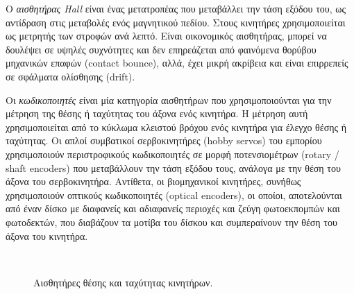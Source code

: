 \begin{enumerate}
Ο \textit{αισθητήρας Hall} είναι ένας μετατροπέας που μεταβάλλει την τάση εξόδου του, ως αντίδραση στις μεταβολές ενός μαγνητικού πεδίου. Στους κινητήρες χρησιμοποιείται ως μετρητής των στροφών ανά λεπτό. Είναι οικονομικός αισθητήρας, μπορεί να δουλέψει σε υψηλές συχνότητες και δεν επηρεάζεται από φαινόμενα θορύβου μηχανικών επαφών (contact bounce), αλλά, έχει μικρή ακρίβεια και είναι επιρρεπείς σε σφάλματα ολίσθησης (drift).

Οι \textit{κωδικοποιητές} είναι μία κατηγορία αισθητήρων που χρησιμοποιούνται για την μέτρηση της θέσης ή ταχύτητας του άξονα ενός κινητήρα. Η μέτρηση αυτή χρησιμοποιείται από το κύκλωμα κλειστού βρόχου ενός κινητήρα για έλεγχο θέσης ή ταχύτητας. Οι απλοί {συμβατικοί σερβοκινητήρες (hobby servos)} του εμπορίου χρησιμοποιούν {περιστροφικούς κωδικοποιητές} σε μορφή ποτενσιομέτρων ({rotary / shaft encoders}) που μεταβάλλουν την τάση εξόδου τους, ανάλογα με την θέση του άξονα του σερβοκινητήρα. Αντίθετα, οι {βιομηχανικοί κινητήρες}, συνήθως χρησιμοποιούν {οπτικούς κωδικοποιητές (optical encoders)}, οι οποίοι, αποτελούνται από έναν δίσκο με διαφανείς και αδιαφανείς περιοχές και ζεύγη φωτοεκπομπών και φωτοδεκτών, που διαβάζουν τα μοτίβα του δίσκου και συμπεραίνουν την θέση του άξονα του κινητήρα.

\begin{figure}[!ht]
	\centering
	\\
	\caption{Αισθητήρες θέσης και ταχύτητας κινητήρων.}
\end{figure}



\end{enumerate}
